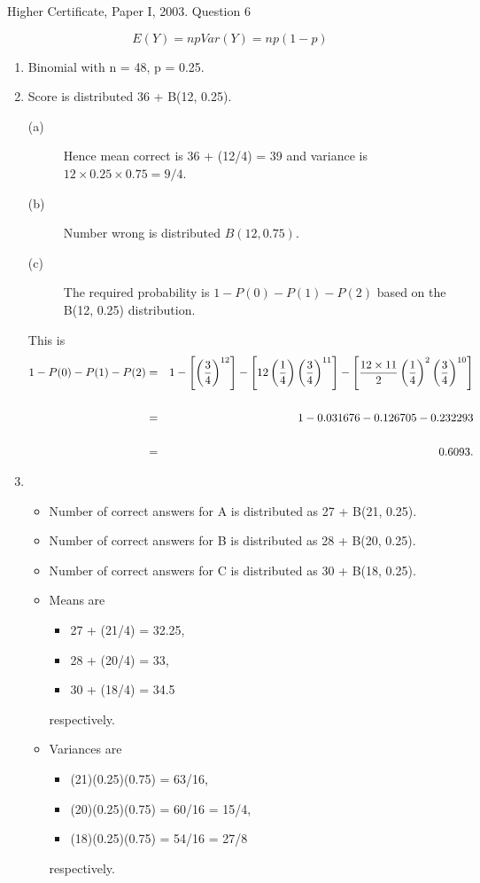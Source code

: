 \documentclass[a4paper,12pt]{article}
\begin{document}
Higher Certificate, Paper I, 2003. Question 6

\[E(Y) = np Var(Y) = np(1 - p)\]
\begin{enumerate}
\item Binomial with n = 48, p = 0.25.
\item Score is distributed 36 + B(12, 0.25).

\begin{description}
\item[(a)] Hence mean correct is 36 + (12/4) = 39 and variance is $12 \times 0.25 \times 0.75 = 9/4$.
\item[(b)] Number wrong is distributed $B(12, 0.75)$.
\item[(c)] The required probability is $1 - P(0) - P(1) - P(2)$ based on the B(12, 0.25)
distribution. 
\end{description}

This is
\begin{eqnarray*}
1 - P(0) - P(1) - P(2) &=& 1- \left[\left(\frac{3}{4}\right)^{12}\right] - \left[12\left(\frac{1}{4}\right) \left(\frac{3}{4}\right)^{11} \right] - \left[\frac{12 \times 11}{2} \left(\frac{1}{4}\right)^{2} \left(\frac{3}{4}\right)^{10}\right]\\ \\ \bigskip
&=& 1- 0.031676 - 0.126705 - 0.232293 \\ \\ \smallskip
&=& 0.6093 .
\end{eqnarray*}
\item 
\begin{itemize}
\item Number of correct answers for A is distributed as 27 + B(21, 0.25).
\item Number of correct answers for B is distributed as 28 + B(20, 0.25).
\item Number of correct answers for C is distributed as 30 + B(18, 0.25).
\end{itemize}
\begin{itemize}
\item Means are 
\begin{itemize}
\item 27 + (21/4) = 32.25, 
\item 28 + (20/4) = 33, 
\item 30 + (18/4) = 34.5
\end{itemize}  
respectively.

\item  Variances are 
\begin{itemize}
\item (21)(0.25)(0.75) = 63/16, 
\item (20)(0.25)(0.75) = 60/16 = 15/4, 
\item (18)(0.25)(0.75) = 54/16 = 27/8 
\end{itemize}  
  respectively.
 

\end{itemize}
\end{enumerate}
\end{document}
